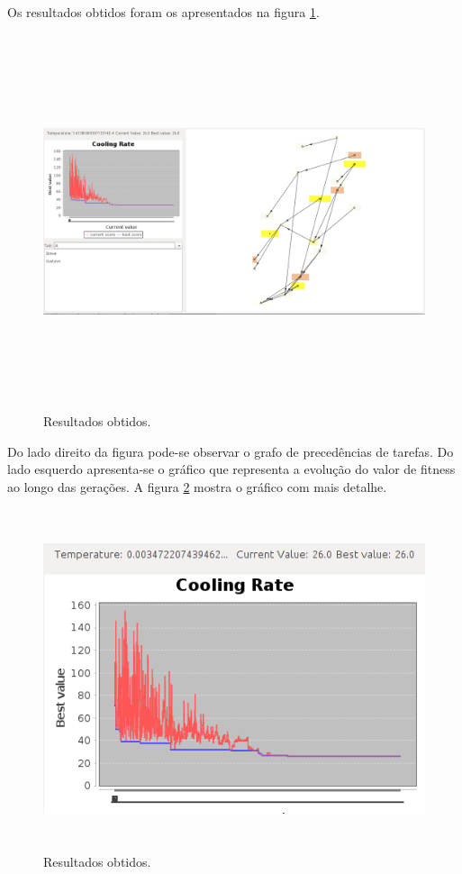 \begin{titlepage}
Os resultados obtidos foram os apresentados na figura \ref{sa_exp1}.

\begin{figure}[H]
  \centering
    \includegraphics[width=19cm, height = 11cm]{sa_result_exp1.png}
  \caption{Resultados obtidos.}
  \label{sa_exp1}
\end{figure}

Do lado direito da figura pode-se observar o grafo de precedências de tarefas. Do lado esquerdo apresenta-se o gráfico que representa a evolução do valor de fitness ao longo das gerações. A figura \ref{sa_graph1} mostra o gráfico com mais detalhe.

\begin{figure}[H]
  \centering
    \includegraphics[width=14cm, height = 10cm]{sa_graph_exp1.png}
  \caption{Resultados obtidos.}
  \label{sa_graph1}
\end{figure}


\end{titlepage}
